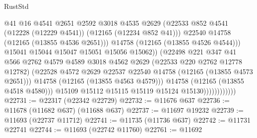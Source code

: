 \begin{lexlean}{RustStd}
\begin{coremodule}
                                      @41
                                      @16
                                      @4541
                                      @2651
                                      @2592
                                      @3018
                                      @4535
                                      @2629
                                      (@22533
                                        @852
                                        @4541
                                        (@12228 (@12229 @4541))
                                        (@12165 (@12234 @852 @41)))
                                      @22540
                                      @14758
                                      (@12165 (@13855 @4536 @2651)))
                                    @14758
                                    (@12165 (@13855 @4526 @4544)))
                                  @15041
                                  @15044
                                  @15047
                                  @15051
                                  @15056
                                  @15062))
                              (@22498
                                @221
                                @347
                                @41
                                @566
                                @2762
                                @4579
                                @4589
                                @3018
                                @4562
                                @2629
                                (@22533 @220 @2762 @12778 @12782)
                                (@22528
                                  @4572
                                  @2629
                                  @22537
                                  @22540
                                  @14758
                                  (@12165 (@13855 @4573 @2651)))
                                @14758
                                (@12165 (@13855 @4563 @4579)))
                              @14758
                              (@12165 (@13855 @4518 @4580)))
                            @15109
                            @15112
                            @15115
                            @15119
                            @15124
                            @15130))))))))))))
@22731 := @22317 (@22342 @22729)
@22732 := @11676 @637
@22736 := @11678 (@11682 @637) (@11688 @637)
@22737 := @11697 @19232
@22739 := @11693 (@22737 @11712)
@22741 := @11735 (@11736 @637)
@22742 := @11731 @22741
@22744 := @11693 (@22742 @11760)
@22761 := @11692

\end{coremodule}
\end{lexlean}
